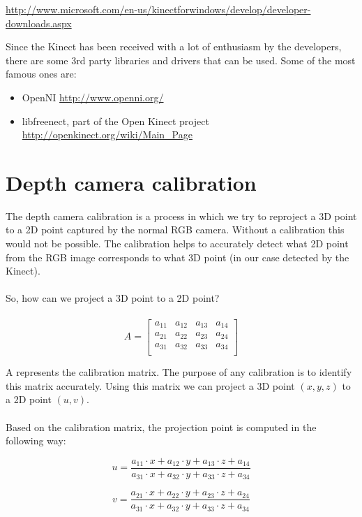 \url{http://www.microsoft.com/en-us/kinectforwindows/develop/developer-downloads.aspx}

\noindent
Since the Kinect has been received with a lot of enthusiasm by the developers, there are some 3rd party libraries and drivers that can be used. Some of the most famous ones are:
\begin{itemize}
	\item OpenNI \url{http://www.openni.org/}
	\item libfreenect, part of the Open Kinect project \url{http://openkinect.org/wiki/Main_Page}
\end{itemize}

\section{Depth camera calibration}
\noindent
The depth camera calibration is a process in which we try to reproject a 3D point to a 2D point captured by the normal RGB camera. Without a calibration this would not be possible. The calibration helps to accurately detect what 2D point from the RGB image corresponds to what 3D point (in our case detected by the Kinect).
\\\\
So, how can we project a 3D point to a 2D point?
\\\\
\[	A =
            \left[ {\begin{array}{cccc}
             a_{11} & a_{12} & a_{13} & a_{14} \\
             a_{21} & a_{22} & a_{23} & a_{24} \\
             a_{31} & a_{32} & a_{33} & a_{34} \\             
             \end{array} } \right]
\]

\noindent
A represents the calibration matrix. The purpose of any calibration is to identify this matrix accurately. Using this matrix we can project a 3D point $(x,y,z)$ to a 2D point $(u,v)$. 
\\\\
Based on the calibration matrix, the projection point is computed in the following way:

$$ u = \frac{a_{11} \cdot x + a_{12} \cdot y + a_{13} \cdot z + a_{14}}{a_{31} \cdot x + a_{32} \cdot y + a_{33} \cdot z + a_{34}} $$

$$ v = \frac{a_{21} \cdot x + a_{22} \cdot y + a_{23} \cdot z + a_{24}}{a_{31} \cdot x + a_{32} \cdot y + a_{33} \cdot z + a_{34}} $$

